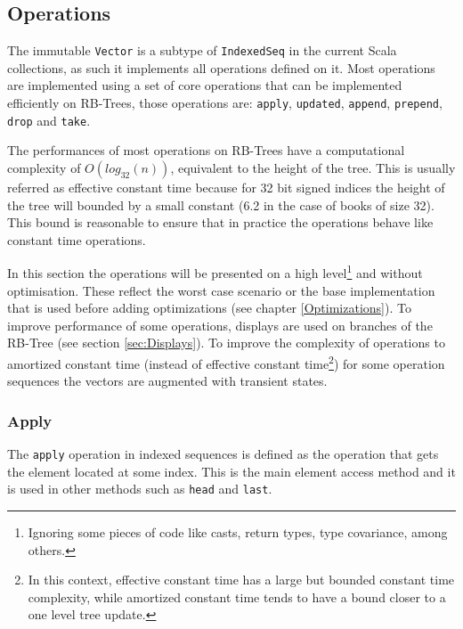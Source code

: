 \subsection{Operations}
\label{Operations}
The immutable \texttt{Vector} \cite{scalaVector211} is a subtype of \texttt{IndexedSeq} in the current Scala collections, as such it implements all operations defined on it. Most operations are implemented using a set of core operations that can be implemented efficiently on RB-Trees, those operations are: \texttt{apply}, \texttt{updated}, \texttt{append}, \texttt{prepend}, \texttt{drop} and \texttt{take}. 

The performances of most operations on RB-Trees have a computational complexity of $O(log_{32}(n))$, equivalent to the height of the tree. This is usually referred as effective constant time because for 32 bit signed indices the height of the tree will bounded by a small constant (6.2 in the case of books of size 32). This bound is reasonable to ensure that in practice the operations behave like constant time operations.  
 
In this section the operations will be presented on a high level\footnote{Ignoring some pieces of code like casts, return types, type covariance, among others.} and without optimisation. These reflect the worst case scenario or the base implementation that is used before adding optimizations (see chapter \ref{Optimizations}). To improve performance of some operations, displays are used on branches of the RB-Tree (see section \ref{sec:Displays}). To improve the complexity of operations to amortized constant time (instead of effective constant time\footnote{In this context, effective constant time has a large but bounded constant time complexity, while amortized constant time tends to have a bound closer to a one level tree update.}) for some operation sequences the vectors are augmented with transient states.


\subsubsection{Apply}
\label{sec:apply}
The \texttt{apply} operation in indexed sequences is defined as the operation that gets the element located at some index. This is the main element access method and it is used in other methods such as \texttt{head} and \texttt{last}.

